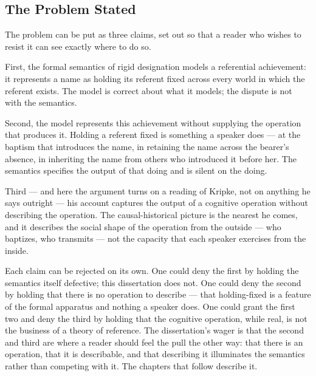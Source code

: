 \documentclass[12pt,a4paper]{article}
\begin{document}
\subsection{The Problem Stated}\label{the-problem-stated}

The problem can be put as three claims, set out so that a reader who wishes to resist it can see exactly where to do so.

First, the formal semantics of rigid designation models a referential achievement: it represents a name as holding its referent fixed across every world in which the referent exists. The model is correct about what it models; the dispute is not with the semantics.

Second, the model represents this achievement without supplying the operation that produces it. Holding a referent fixed is something a speaker does --- at the baptism that introduces the name, in retaining the name across the bearer's absence, in inheriting the name from others who introduced it before her. The semantics specifies the output of that doing and is silent on the doing.

Third --- and here the argument turns on a reading of Kripke, not on anything he says outright --- his account captures the output of a cognitive operation without describing the operation. The causal-historical picture is the nearest he comes, and it describes the social shape of the operation from the outside --- who baptizes, who transmits --- not the capacity that each speaker exercises from the inside.

Each claim can be rejected on its own. One could deny the first by holding the semantics itself defective; this dissertation does not. One could deny the second by holding that there is no operation to describe --- that holding-fixed is a feature of the formal apparatus and nothing a speaker does. One could grant the first two and deny the third by holding that the cognitive operation, while real, is not the business of a theory of reference. The dissertation's wager is that the second and third are where a reader should feel the pull the other way: that there is an operation, that it is describable, and that describing it illuminates the semantics rather than competing with it. The chapters that follow describe it.
\end{document}
